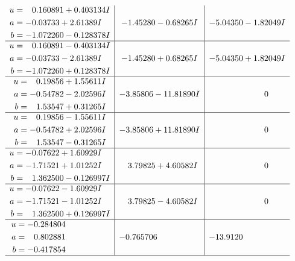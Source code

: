 \documentclass[1p]{elsarticle_modified}
\theoremstyle{definition}
\begin{document}
$$\begin{array}{c|c|c}
\begin{aligned}
u &= \phantom{-}0.160891 + 0.403134 I \\
a &= -0.03733 + 2.61389 I \\
b &= -1.072260 - 0.128378 I\end{aligned}
 & -1.45280 - 0.68265 I & -5.04350 - 1.82049 I \\ \hline\begin{aligned}
u &= \phantom{-}0.160891 - 0.403134 I \\
a &= -0.03733 - 2.61389 I \\
b &= -1.072260 + 0.128378 I\end{aligned}
 & -1.45280 + 0.68265 I & -5.04350 + 1.82049 I \\ \hline\begin{aligned}
u &= \phantom{-}0.19856 + 1.55611 I \\
a &= -0.54782 - 2.02596 I \\
b &= \phantom{-}1.53547 + 0.31265 I\end{aligned}
 & -3.85806 - 11.81890 I & \phantom{-0.000000 } 0 \\ \hline\begin{aligned}
u &= \phantom{-}0.19856 - 1.55611 I \\
a &= -0.54782 + 2.02596 I \\
b &= \phantom{-}1.53547 - 0.31265 I\end{aligned}
 & -3.85806 + 11.81890 I & \phantom{-0.000000 } 0 \\ \hline\begin{aligned}
u &= -0.07622 + 1.60929 I \\
a &= -1.71521 + 1.01252 I \\
b &= \phantom{-}1.362500 - 0.126997 I\end{aligned}
 & \phantom{-}3.79825 + 4.60582 I & \phantom{-0.000000 } 0 \\ \hline\begin{aligned}
u &= -0.07622 - 1.60929 I \\
a &= -1.71521 - 1.01252 I \\
b &= \phantom{-}1.362500 + 0.126997 I\end{aligned}
 & \phantom{-}3.79825 - 4.60582 I & \phantom{-0.000000 } 0 \\ \hline\begin{aligned}
u &= -0.284804\phantom{ +0.000000I} \\
a &= \phantom{-}0.802881\phantom{ +0.000000I} \\
b &= -0.417854\phantom{ +0.000000I}\end{aligned}
 & -0.765706\phantom{ +0.000000I} & -13.9120\phantom{ +0.000000I}\\
 \hline 
 \end{array}$$\newpage\newpage\renewcommand{\arraystretch}{1}
\end{document}
